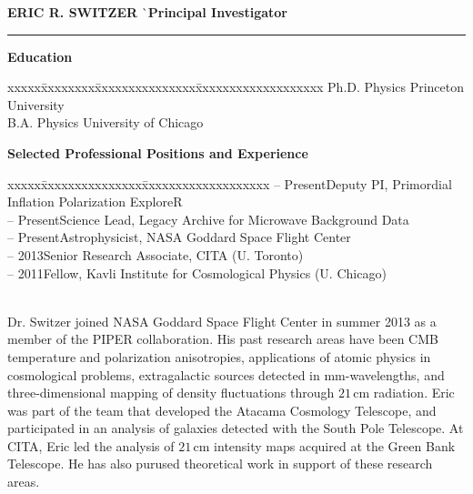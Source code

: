 \documentclass[12pt]{article}
\begin{document}
\vspace{-3mm}
\noindent
\begin{tabbing}
{\bf ERIC R. SWITZER} \` \small{{\bf Principal Investigator}} \\
\end{tabbing}
\vspace{-7mm}
\hrule height 0.7pt

\vspace{5mm}
\addressminimal{\lastupdated}

\small{
\noindent
{\bf Education}
\vspace{-3mm}
\begin{tabbing}
xxxxx\=xxxxxxxx\=xxxxxxxxxxxxxxx\=xxxxxxxxxxxxxxxxxxx\kill
{} \> Ph.D. Physics \> Princeton University \\
 \> B.A. Physics \> University of Chicago \\
\end{tabbing}}

\vspace{-5mm}
\small{
\noindent
{\bf Selected Professional Positions and Experience}
\vspace{-3mm}
\begin{tabbing}
xxxxx\=xxxxxxxxxxxxxxx\=xxxxxxxxxxxxxxxxxxx\kill
{} -- Present\>Deputy PI, Primordial Inflation Polarization ExploreR \\
 -- Present\>Science Lead, Legacy Archive for Microwave Background Data \\
 -- Present\>Astrophysicist, NASA Goddard Space Flight Center \\
 -- 2013\>Senior Research Associate, CITA (U. Toronto) \\
 -- 2011\>Fellow, Kavli Institute for Cosmological Physics (U. Chicago) \\
\end{tabbing}}

\vspace{-2mm} \small{ \\ Dr. Switzer joined
NASA Goddard Space Flight Center in summer 2013 as a member of the PIPER
collaboration. His past research areas have been CMB temperature and
polarization anisotropies, applications of atomic physics in cosmological
problems, extragalactic sources detected in mm-wavelengths, and
three-dimensional mapping of density fluctuations through $21$\,cm radiation. Eric
was part of the team that developed the Atacama Cosmology Telescope, and
participated in an analysis of galaxies detected with the South Pole Telescope.
At CITA, Eric led the analysis of $21$\,cm intensity maps acquired at the Green
Bank Telescope. He has also purused theoretical work in support of these
research areas.  }

\vspace{5mm}
\begin{list}{}{%
\setlength{\topsep}{0pt}%
\setlength{\leftmargin}{0.1in}%
\setlength{\listparindent}{-0.1in}%
\setlength{\itemindent}{-0.1in}%
\setlength{\parsep}{\parskip}%
}%
%

\end{list}
\end{document}
